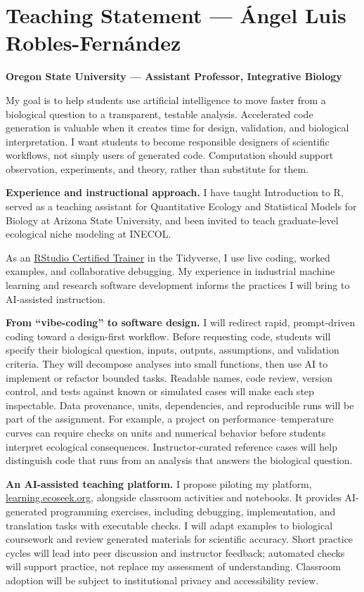 \documentclass[11pt,letterpaper]{article}
\begin{document}
\section*{Teaching Statement --- \'{A}ngel Luis Robles-Fern\'andez}
\textbf{Oregon State University --- Assistant Professor, Integrative Biology}

My goal is to help students use artificial intelligence to move faster from a biological question to a transparent, testable analysis. Accelerated code generation is valuable when it creates time for design, validation, and biological interpretation. I want students to become responsible designers of scientific workflows, not simply users of generated code. Computation should support observation, experiments, and theory, rather than substitute for them.

\textbf{Experience and instructional approach.}
I have taught Introduction to R, served as a teaching assistant for Quantitative Ecology and Statistical Models for Biology at Arizona State University, and been invited to teach graduate-level ecological niche modeling at INECOL. 

As an \href{https://education.rstudio.com/trainers/people/robles-angel/}{RStudio Certified Trainer} in the Tidyverse, I use live coding, worked examples, and collaborative debugging. My experience in industrial machine learning and research software development informs the practices I will bring to AI-assisted instruction.

\textbf{From ``vibe-coding'' to software design.}
I will redirect rapid, prompt-driven coding toward a design-first workflow. Before requesting code, students will specify their biological question, inputs, outputs, assumptions, and validation criteria. They will decompose analyses into small functions, then use AI to implement or refactor bounded tasks. Readable names, code review, version control, and tests against known or simulated cases will make each step inspectable. Data provenance, units, dependencies, and reproducible runs will be part of the assignment. For example, a project on performance--temperature curves can require checks on units and numerical behavior before students interpret ecological consequences. Instructor-curated reference cases will help distinguish code that runs from an analysis that answers the biological question.

\textbf{An AI-assisted teaching platform.}
I propose piloting my platform, \href{https://learning.ecoseek.org}{learning.ecoseek.org}, alongside classroom activities and notebooks. It provides AI-generated programming exercises, including debugging, implementation, and translation tasks with executable checks. I will adapt examples to biological coursework and review generated materials for scientific accuracy. Short practice cycles will lead into peer discussion and instructor feedback; automated checks will support practice, not replace my assessment of understanding. Classroom adoption will be subject to institutional privacy and accessibility review.
\end{document}
